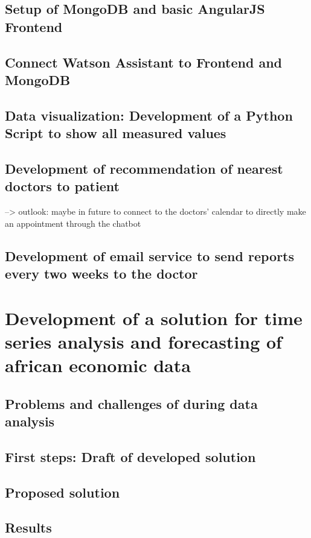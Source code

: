 \section{Setup of MongoDB and basic AngularJS Frontend}

\section{Connect Watson Assistant to Frontend and MongoDB}

\section{Data visualization: Development of a Python Script to show all measured values}

\section{Development of recommendation of nearest doctors to patient}
--> outlook: maybe in future to connect to the doctors' calendar to directly make an appointment through the chatbot

\section{Development of email service to send reports every two weeks to the doctor}


\chapter{Development of a solution for time series analysis and forecasting of african economic data}\label{development}
\section{Problems and challenges of during data analysis}\label{problems_challenges}

\section{First steps: Draft of developed solution}\label{draft}

\section{Proposed solution}\label{proposed_solution}

\section{Results}\label{results}

